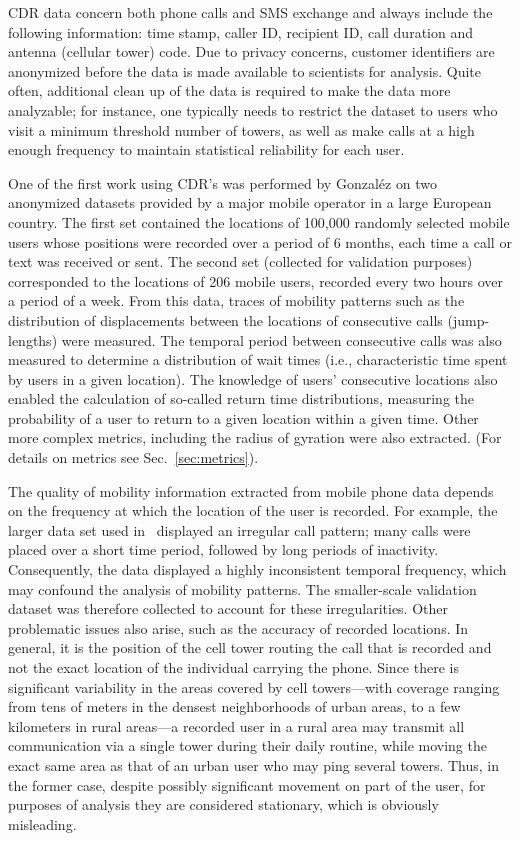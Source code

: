 CDR data concern both phone calls and SMS exchange and always include the following information: time stamp, caller ID, recipient ID, call duration and antenna (cellular tower) code. Due to privacy concerns, customer identifiers are anonymized before the data is made available to scientists for analysis. Quite often, additional clean up of the data is required to make the data more analyzable; for instance, one typically needs to restrict the dataset to users who visit a minimum threshold number of towers, as well as make calls at a high enough frequency to maintain statistical reliability for each user.

One of the first work using CDR's was performed by Gonzal\'ez \et\cite{gonzalez_2008_understanding} on two anonymized datasets provided by a major mobile operator in a large European country. The first set contained the locations of 100,000 randomly selected mobile users whose positions were recorded over a period of 6 months, each time a call or text was received or sent. The second set (collected for validation purposes) corresponded to the locations of 206 mobile users, recorded every two hours over a period of a week. From this data, traces of mobility patterns such as the distribution of displacements between the locations of consecutive calls (jump-lengths) were measured. The temporal period between consecutive calls was also measured to determine a distribution of wait times (i.e., characteristic time spent by users in a given location). The knowledge of users' consecutive locations also enabled the calculation of so-called return time distributions, measuring the probability of a user to return to a given location within a given time. Other more complex metrics, including the radius of gyration were also extracted. (For details on metrics see Sec.~\ref{sec:metrics}). 

The quality of mobility information extracted from mobile phone data depends on the frequency at which the location of the user is recorded. For example, the larger data set used in~\cite{gonzalez_2008_understanding} displayed an irregular call pattern; many calls were placed over a short time period, followed by long periods of inactivity. Consequently, the data displayed a highly inconsistent temporal frequency, which may confound the analysis of mobility patterns. The smaller-scale validation dataset was therefore collected to account for these irregularities. Other problematic issues also arise, such as the accuracy of recorded locations. In general, it is the position of the cell tower routing the call that is recorded and not the exact location of the individual carrying the phone. Since there is significant variability in the areas covered by cell towers---with coverage ranging from tens of meters in the densest neighborhoods of urban areas, to a few kilometers in rural areas---a recorded user in a rural area may transmit all communication via a single tower during their daily routine, while moving the exact same area as that of an urban user who may ping several towers. Thus, in the former case, despite possibly significant movement on part of the user, for purposes of analysis they are considered stationary, which is obviously misleading.

